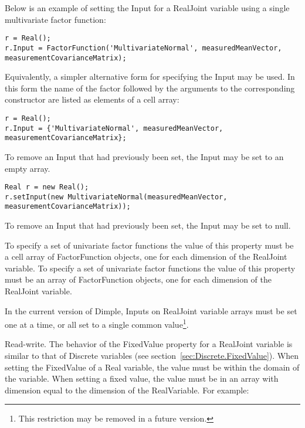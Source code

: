 Below is an example of setting the Input for a RealJoint variable using a single multivariate factor function:

\ifmatlab

\begin{lstlisting}
r = Real();
r.Input = FactorFunction('MultivariateNormal', measuredMeanVector, measurementCovarianceMatrix);
\end{lstlisting}

Equivalently, a simpler alternative form for specifying the Input may be used.  In this form the name of the factor followed by the arguments to the corresponding constructor are listed as elements of a cell array:

\begin{lstlisting}
r = Real();
r.Input = {'MultivariateNormal', measuredMeanVector, measurementCovarianceMatrix};
\end{lstlisting}

To remove an Input that had previously been set, the Input may be set to an empty array.

\fi

\ifjava

\begin{lstlisting}
Real r = new Real();
r.setInput(new MultivariateNormal(measuredMeanVector, measurementCovarianceMatrix));
\end{lstlisting}

To remove an Input that had previously been set, the Input may be set to null.

\fi

\ifmatlab
To specify a set of univariate factor functions the value of this property must be a cell array of FactorFunction objects, one for each dimension of the RealJoint variable.
\fi
\ifjava
To specify a set of univariate factor functions the value of this property must be an array of FactorFunction objects, one for each dimension of the RealJoint variable.
\fi

\ifmatlab
In the current version of Dimple, Inputs on RealJoint variable arrays must be set one at a time, or all set to a single common value\footnote{This restriction may be removed in a future version.}.
\fi


\label{sec:RealJoint.FixedValue}

Read-write.  The behavior of the FixedValue property for a RealJoint variable is similar to that of Discrete variables (see section~\ref{sec:Discrete.FixedValue}).  When setting the FixedValue of a Real variable, the value must be within the domain of the variable.  When setting a fixed value, the value must be in an array with dimension equal to the dimension of the RealVariable.  For example:

